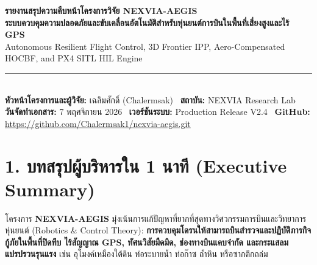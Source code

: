 \documentclass[10pt,a4paper]{article}
\begin{document}
\begin{headerbox}
  \begin{center}
    {\Huge \textbf{รายงานสรุปความคืบหน้าโครงการวิจัย NEXVIA-AEGIS}}\\[6pt]
    {\large \textbf{ระบบควบคุมความปลอดภัยและขับเคลื่อนอัตโนมัติสำหรับหุ่นยนต์การบินในพื้นที่เสี่ยงสูงและไร้ GPS}}\\[4pt]
    {\footnotesize \textcolor{gray!30}{Autonomous Resilient Flight Control, 3D Frontier IPP, Aero-Compensated HOCBF, and PX4 SITL HIL Engine}}\\[8pt]
    \rule{0.9\textwidth}{0.5pt}\\[6pt]
    {\small \textbf{หัวหน้าโครงการและผู้วิจัย:} เฉลิมศักดิ์ (Chalermsak) \textbar\ \textbf{สถาบัน:} NEXVIA Research Lab}\\[2pt]
    {\footnotesize \textbf{วันจัดทำเอกสาร:} 7 พฤศจิกายน 2026 \textbar\ \textbf{เวอร์ชันระบบ:} Production Release V2.4 \textbar\ \textbf{GitHub:} \url{https://github.com/Chalermsak1/nexvia-aegis.git}}
  \end{center}
\end{headerbox}

\vspace{6pt}

\section*{\textcolor{primary}{1. บทสรุปผู้บริหารใน 1 นาที (Executive Summary)}}

โครงการ \textbf{NEXVIA-AEGIS} มุ่งเน้นการแก้ปัญหาที่ยากที่สุดทางวิศวกรรมการบินและวิทยาการหุ่นยนต์ (Robotics \& Control Theory): \textbf{การควบคุมโดรนให้สามารถบินสำรวจและปฏิบัติภารกิจกู้ภัยในพื้นที่ปิดทึบ ไร้สัญญาณ GPS, ทัศนวิสัยมืดมิด, ช่องทางบินแคบจำกัด และกระแสลมแปรปรวนรุนแรง} เช่น อุโมงค์เหมืองใต้ดิน ท่อระบายน้ำ ท่อก๊าซ ถ้ำหิน หรือซากตึกถล่ม
\end{document}
